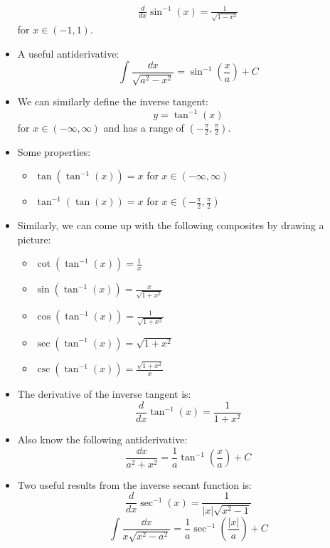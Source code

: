 \begin{itemize}
\begin{align}
        \frac{d}{dx} \sin^{-1}(x) = \frac{1}{\sqrt{1-x^2}}
    \end{align}
    for $x\in (-1,1)$.
    \item A useful antiderivative:
        \begin{equation}
            \int \frac{\dd{x}}{\sqrt{a^2-x^2}} = \sin^{-1}\left(\frac{x}{a}\right) + C
            \label{eq:}
        \end{equation}
    \item We can similarly define the inverse tangent:
    \begin{equation}
        y = \tan^{-1}(x)
        \label{eq:}
    \end{equation}
    for $x\in(-\infty,\infty)$ and has a range of $\left(-\frac{\pi}{2}, \frac{\pi}{2}\right)$.
    \item Some properties:
    \begin{itemize}
        \item $\tan(\tan^{-1}(x)) = x$ for $x\in (-\infty, \infty)$
        \item $\tan^{-1}(\tan(x)) = x $ for $x\in\left(-\frac{\pi}{2}, \frac{\pi}{2}\right)$
    \end{itemize}
    \item Similarly, we can come up with the following composites by drawing a picture:
    \begin{itemize}
        \item $\cot\left(\tan^{-1}(x)\right) = \frac{1}{x}$
        \item $\sin(\tan^{-1}(x))= \frac{x}{\sqrt{1+x^2}}$
        \item $\cos(\tan^{-1}(x)) = \frac{1}{\sqrt{1+x^2}}$
        \item $\sec(\tan^{-1}(x)) = \sqrt{1+x^2}$
        \item $\csc(\tan^{-1}(x)) = \frac{\sqrt{1+x^2}}{x}$
    \end{itemize}
    \item The derivative of the inverse tangent is:
    \begin{equation}
        \frac{d}{dx}\tan^{-1}(x) = \frac{1}{1+x^2}
        \label{eq:}
    \end{equation}

    \item Also know the following antiderivative:
    \begin{equation}
        \frac{\dd{x}}{a^2+x^2} = \frac{1}{a}\tan^{-1}\left(\frac{x}{a}\right) + C
        \label{eq:}
    \end{equation}
    \item Two useful results from the inverse secant function is:
    \begin{equation}
        \frac{d}{dx}\sec^{-1}(x) = \frac{1}{|x|\sqrt{x^2-1}}
        \label{eq:}
    \end{equation}
    \begin{equation}
        \int \frac{\dd{x}}{x\sqrt{x^2-a^2}} = \frac{1}{a}\sec^{-1}\left(\frac{|x|}{a}\right) + C
        \label{eq:}
    \end{equation}
    
\end{itemize}